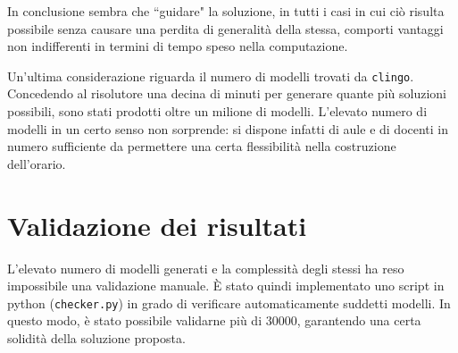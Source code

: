 In conclusione sembra che ``guidare" la soluzione, in tutti i casi in cui ciò risulta possibile senza causare una perdita di generalità della stessa, comporti vantaggi non indifferenti in termini di tempo speso nella computazione.

Un'ultima considerazione riguarda il numero di modelli trovati da \texttt{clingo}. Concedendo al risolutore una decina di minuti per generare quante più soluzioni possibili, sono stati prodotti oltre un milione di modelli. L'elevato numero di modelli in un certo senso non sorprende: si dispone infatti di aule e di docenti in numero sufficiente da permettere una certa flessibilità nella costruzione dell'orario.

\section{Validazione dei risultati}
L'elevato numero di modelli generati e la complessità degli stessi ha reso impossibile una validazione manuale. È stato quindi implementato uno script in python (\texttt{checker.py}) in grado di verificare automaticamente suddetti modelli. In questo modo, è stato possibile validarne più di 30000, garantendo una certa solidità della soluzione proposta. 
